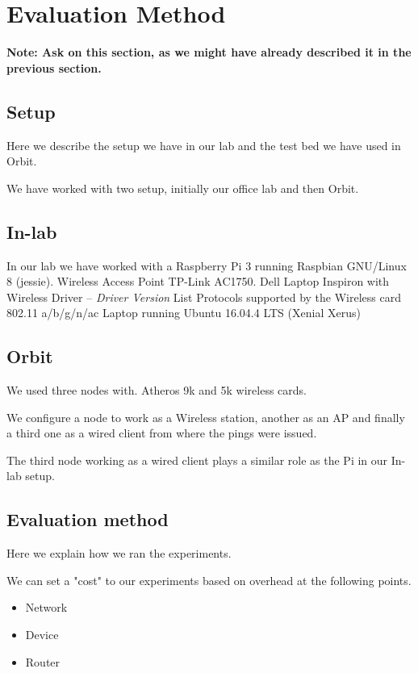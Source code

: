 \section{Evaluation Method}\label{Evaluation_Method}

\textbf{Note: Ask on this section, as we might have already described it in the previous section.}

\subsection{Setup}

Here we describe the setup we have in our lab and the test bed we have used in Orbit.

We have worked with two setup, initially our office lab and then Orbit.

\subsection*{In-lab}

In our lab we have worked with a Raspberry Pi 3 running Raspbian GNU/Linux 8 (jessie).
Wireless Access Point TP-Link AC1750.
Dell Laptop Inspiron with Wireless Driver -- \emph{Driver Version}
List Protocols supported by the Wireless card 802.11 a/b/g/n/ac
Laptop running Ubuntu 16.04.4 LTS (Xenial Xerus)

\subsection*{Orbit}

We used three nodes with.
Atheros 9k and 5k wireless cards.

We configure a node to work as a Wireless station, another as an AP and finally a third one as a wired client from where the pings were issued.

The third node working as a wired client plays a similar role as the Pi in our In-lab setup.


\subsection{Evaluation method}

Here we explain how we ran the experiments.

We can set a "cost" to our experiments based on overhead at the following points.

\begin{itemize}
	\item Network
	\item Device
	\item Router
\end{itemize}


